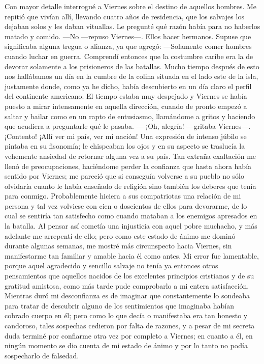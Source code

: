 \documentclass{novela}
\begin{document}
    Con mayor detalle interrogué a Viernes sobre el destino de aquellos hombres. Me repitió que vivían allí, llevando cuatro años de residencia, que los salvajes los dejaban solos y les daban vituallas. Le pregunté qué razón había para no haberlos matado y comido.
    —No —repuso Viernes—. Ellos hacer hermanos.
    Supuse que significaba alguna tregua o alianza, ya que agregó:
    —Solamente comer hombres cuando luchar en guerra.
    Comprendí entonces que la costumbre caribe era la de devorar solamente a los prisioneros de las batallas.
    Mucho tiempo después de esto nos hallábamos un día en la cumbre de la colina situada en el lado este de la isla, justamente donde, como ya he dicho, había descubierto en un día claro el perfil del continente americano. El tiempo estaba muy despejado y Viernes se había puesto a mirar intensamente en aquella dirección, cuando de pronto empezó a saltar y bailar como en un rapto de entusiasmo, llamándome a gritos y haciendo que acudiera a preguntarle qué le pasaba.
    — ¡Oh, alegría! —gritaba Viernes—. ¡Contento! ¡Allí ver mi país, ver mi nación!
    Una expresión de intenso júbilo se pintaba en su fisonomía; le chispeaban los ojos y en su aspecto se traslucía la vehemente ansiedad de retornar alguna vez a su país. Tan extraña exaltación me llenó de preocupaciones, haciéndome perder la confianza que hasta ahora había sentido por Viernes; me pareció que si conseguía volverse a su pueblo no sólo olvidaría cuanto le había enseñado de religión sino también los deberes que tenía para conmigo. Probablemente hiciera a sus compatriotas una relación de mi persona y tal vez volviese con cien o doscientos de ellos para devorarme, de lo cual se sentiría tan satisfecho como cuando mataban a los enemigos apresados en la batalla.
    Al pensar así cometía una injusticia con aquel pobre muchacho, y más adelante me arrepentí de ello; pero como este estado de ánimo me dominó durante algunas semanas, me mostré más circunspecto hacia Viernes, sin manifestarme tan familiar y amable hacia él como antes. Mi error fue lamentable, porque aquel agradecido y sencillo salvaje no tenía ya entonces otros pensamientos que aquellos nacidos de los excelentes principios cristianos y de su gratitud amistosa, como más tarde pude comprobarlo a mi entera satisfacción.
    Mientras duró mi desconfianza es de imaginar que constantemente lo sondeaba para tratar de descubrir alguno de los sentimientos que imaginaba habían cobrado cuerpo en él; pero como lo que decía o manifestaba era tan honesto y candoroso, tales sospechas cedieron por falta de razones, y a pesar de mi secreta duda terminé por confiarme otra vez por completo a Viernes; en cuanto a él, en ningún momento se dio cuenta de mi estado de ánimo y por lo tanto no podía sospecharlo de falsedad.
\end{document}
